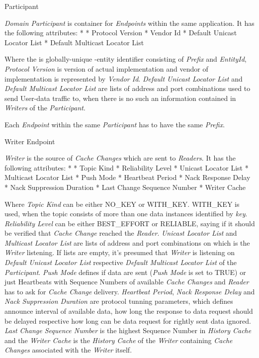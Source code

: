 \secc Participant

{\em Domain Participant} is container for {\em Endpoints} within the same application. It has the following attributes:
\begitems
* 
* Protocol Version
* Vendor Id
* Default Unicast Locator List
* Default Multicast Locator List
\enditems

Where the {\em {}} is globally-unique -entity identifier consisting of {\em {} Prefix} and {\em EntityId}, {\em Protocol Version} is version of actual implementation and vendor of implementation is represented by {\em Vendor Id}. {\em Default Unicast Locator List} and {\em Default Multicast Locator List} are lists of  address and port combinations used to send User-data traffic to, when there is no such an information contained in {\em Writers} of the {\em Participant}.

Each {\em Endpoint} within the same {\em Participant} has to have the same {\em {} Prefix}.

\secc Writer Endpoint

{\em Writer} is the source of {\em Cache Changes} which are sent to {\em Readers}. It has the following attributes:
\begitems
* 
* Topic Kind
* Reliability Level
* Unicast Locator List
* Multicast Locator List
* Push Mode
* Heartbeat Period
* Nack Response Delay
* Nack Suppression Duration
* Last Change Sequence Number
* Writer Cache
\enditems

Where {\em Topic Kind} can be either NO\_KEY or WITH\_KEY. WITH\_KEY is used, when the topic consists of more than one data instances identified by {\em key}. {\em Reliability Level} can be either BEST\_EFFORT or RELIABLE, saying if it should be verified that {\em Cache Change} reached the {\em Reader}. {\em Unicast Locator List} and {\em Multicast Locator List} are lists of  address and port combinations on which is the {\em Writer} listening. If lists are empty, it's presumed that {\em Writer} is listening on {\em Default Unicast Locator List} respective {\em Default Multicast Locator List} of the {\em Participant}. {\em Push Mode} defines if data are sent ({\em Push Mode} is set to TRUE) or just Heartbeats with Sequence Numbers of available {\em Cache Changes} and {\em Reader} has to ask for {\em Cache Change} delivery. {\em Heartbeat Period}, {\em Nack Response Delay} and {\em Nack Suppression Duration} are protocol tunning parameters, which defines announce interval of available data, how long the response to data request should be delayed respective how long can be data request for rightly sent data ignored. {\em Last Change Sequence Number} is the highest Sequence Number in {\em History Cache} and the {\em Writer Cache} is the {\em History Cache} of the {\em Writer} containing {\em Cache Changes} associated with the {\em Writer} itself.

